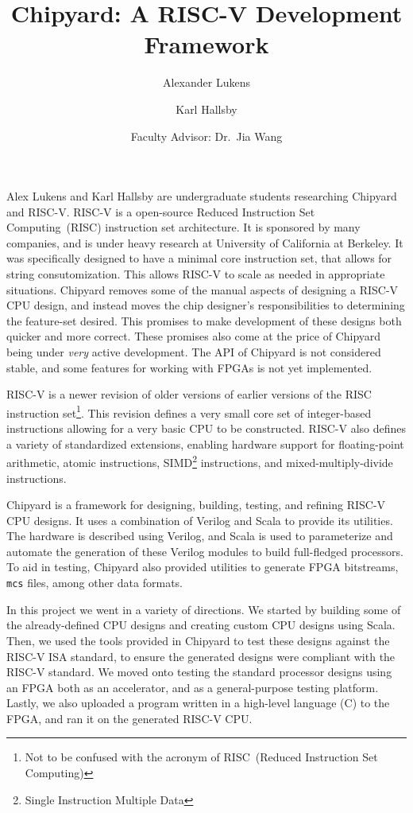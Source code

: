 \documentclass[10pt,letterpaper,final,twoside,notitlepage]{article}
\title{Chipyard: A RISC-V Development Framework}
\author{Alexander Lukens \and Karl Hallsby \and Faculty Advisor: Dr.\ Jia Wang}
\date{\DTMdisplaydate{2021}{4}{9}{-1}} %
\begin{document}
\maketitle
{} %

\nocite{chipyard}

Alex Lukens and Karl Hallsby are undergraduate students researching Chipyard~\cite{chipyard} and RISC-V.
RISC-V is a open-source Reduced Instruction Set Computing~(RISC) instruction set architecture.
It is sponsored by many companies, and is under heavy research at University of California at Berkeley.
It was specifically designed to have a minimal core instruction set, that allows for string consutomization.
This allows RISC-V to scale as needed in appropriate situations.
Chipyard removes some of the manual aspects of designing a RISC-V CPU design, and instead moves the chip designer's responsibilities to determining the feature-set desired.
This promises to make development of these designs both quicker and more correct.
These promises also come at the price of Chipyard being under \emph{very} active development.
The API of Chipyard is not considered stable, and some features for working with FPGAs is not yet implemented.

RISC-V is a newer revision of older versions of earlier versions of the RISC instruction set\footnote{Not to be confused with the acronym of RISC~(Reduced Instruction Set Computing)}.
This revision defines a very small core set of integer-based instructions allowing for a very basic CPU to be constructed.
RISC-V also defines a variety of standardized extensions, enabling hardware support for floating-point arithmetic, atomic instructions, SIMD\footnote{Single Instruction Multiple Data} instructions, and mixed-multiply-divide instructions.

Chipyard is a framework for designing, building, testing, and refining RISC-V CPU designs.
It uses a combination of Verilog and Scala to provide its utilities.
The hardware is described using Verilog, and Scala is used to parameterize and automate the generation of these Verilog modules to build full-fledged processors.
To aid in testing, Chipyard also provided utilities to generate FPGA bitstreams, \texttt{mcs} files, among other data formats.

In this project we went in a variety of directions.
We started by building some of the already-defined CPU designs and creating custom CPU designs using Scala.
Then, we used the tools provided in Chipyard to test these designs against the RISC-V ISA standard, to ensure the generated designs were compliant with the RISC-V standard.
We moved onto testing the standard processor designs using an FPGA both as an accelerator, and as a general-purpose testing platform.
Lastly, we also uploaded a program written in a high-level language (C) to the FPGA, and ran it on the generated RISC-V CPU.\@
\end{document}
